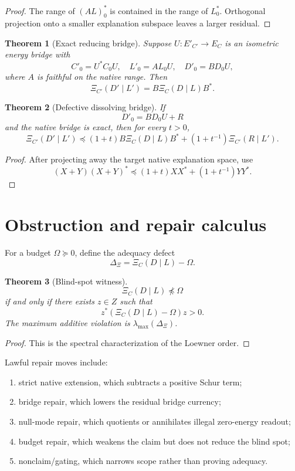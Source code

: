 \documentclass[11pt]{article}
\newtheorem{theorem}{Theorem}[section]
\begin{document}
\begin{proof}
The range of $(AL)_0^*$ is contained in the range of $L_0^*$.  Orthogonal projection onto a smaller explanation subspace leaves a larger residual.
\end{proof}

\begin{theorem}[Exact reducing bridge]
Suppose $U:E'_{C'}\to E_C$ is an isometric energy bridge with
\[
C'_0=U^*C_0U,
\quad
L'_0=AL_0U,
\quad
D'_0=BD_0U,
\]
where $A$ is faithful on the native range.  Then
\[
\boxed{\Xi_{C'}(D'\mid L')=B\Xi_C(D\mid L)B^*.}
\]
\end{theorem}

\begin{theorem}[Defective dissolving bridge]
If
\[
D'_0=BD_0U+R
\]
and the native bridge is exact, then for every $t>0$,
\[
\boxed{\Xi_{C'}(D'\mid L')
\preceq
(1+t)B\Xi_C(D\mid L)B^*+(1+t^{-1})\Xi_{C'}(R\mid L').}
\]
\end{theorem}

\begin{proof}
After projecting away the target native explanation space, use
\[
(X+Y)(X+Y)^*\preceq (1+t)XX^*+(1+t^{-1})YY^*.
\]
\end{proof}

\section{Obstruction and repair calculus}

For a budget $\Omega\succeq0$, define the adequacy defect
\[
\Delta_\Xi=\Xi_C(D\mid L)-\Omega.
\]

\begin{theorem}[Blind-spot witness]
\[
\Xi_C(D\mid L)\npreceq \Omega
\]
if and only if there exists $z\in Z$ such that
\[
\boxed{z^*(\Xi_C(D\mid L)-\Omega)z>0.}
\]
The maximum additive violation is $\lambda_{\max}(\Delta_\Xi)$.
\end{theorem}

\begin{proof}
This is the spectral characterization of the Loewner order.
\end{proof}

Lawful repair moves include:
\begin{enumerate}[label=(\alph*)]
\item strict native extension, which subtracts a positive Schur term;
\item bridge repair, which lowers the residual bridge currency;
\item null-mode repair, which quotients or annihilates illegal zero-energy readout;
\item budget repair, which weakens the claim but does not reduce the blind spot;
\item nonclaim/gating, which narrows scope rather than proving adequacy.
\end{enumerate}
\end{document}
